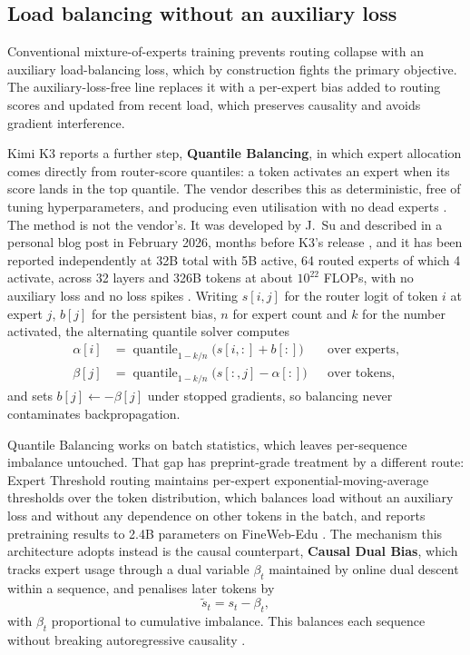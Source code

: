 \documentclass[11pt]{article}
\begin{document}
\subsection{Load balancing without an auxiliary loss}
\label{sec:qb}

Conventional mixture-of-experts training prevents routing collapse with an auxiliary load-bal\-anc\-ing loss, which by construction fights the primary objective. The auxiliary-loss-free line \cite{wang2024lossfree} replaces it with a per-expert bias added to routing scores and updated from recent load, which preserves causality and avoids gradient interference.

Kimi K3 reports a further step, \textbf{Quantile Balancing}, in which expert allocation comes directly from router-score quantiles: a token activates an expert when its score lands in the top quantile. The vendor describes this as deterministic, free of tuning hyperparameters, and producing even utilisation with no dead experts \cite{moonshot2026k3,huang2026k3}. The method is not the vendor's. It was developed by J.~Su and described in a personal blog post in February 2026, months before K3's release \cite{su2026qb}, and it has been reported independently at 32B total with 5B active, 64 routed experts of which 4 activate, across 32 layers and 326B tokens at about $10^{22}$ FLOPs, with no auxiliary loss and no loss spikes \cite{openathena2026qb}. Writing $s[i,j]$ for the router logit of token $i$ at expert $j$, $b[j]$ for the persistent bias, $n$ for expert count and $k$ for the number activated, the alternating quantile solver computes
\begin{align}
\alpha[i] &= \operatorname{quantile}_{1-k/n}\bigl(s[i,:] + b[:]\bigr) && \text{over experts,}\\
\beta[j]  &= \operatorname{quantile}_{1-k/n}\bigl(s[:,j] - \alpha[:]\bigr) && \text{over tokens,}
\end{align}
and sets $b[j] \leftarrow -\beta[j]$ under stopped gradients, so balancing never contaminates backpropagation.

Quantile Balancing works on batch statistics, which leaves per-sequence imbalance untouched. That gap has preprint-grade treatment by a different route: Expert Threshold routing maintains per-expert exponential-moving-average thresholds over the token distribution, which balances load without an auxiliary loss and without any dependence on other tokens in the batch, and reports pretraining results to 2.4B parameters on FineWeb-Edu \cite{sun2026et}. The mechanism this architecture adopts instead is the causal counterpart, \textbf{Causal Dual Bias}, which tracks expert usage through a dual variable $\beta_t$ maintained by online dual descent within a sequence, and penalises later tokens by
\begin{equation}
\tilde{s}_t = s_t - \beta_t ,
\label{eq:cdb}
\end{equation}
with $\beta_t$ proportional to cumulative imbalance. This balances each sequence without breaking autoregressive causality \cite{chang2026cdb}.
\end{document}
